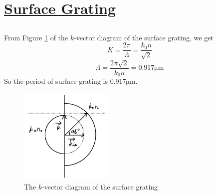 \documentclass[fontsize=11pt]{scrartcl}
\begin{document}
\section{\uline{Surface Grating}}
\subsection{}
From Figure \ref{fig1.1} of the $k$-vector diagram of the surface grating, we get
\begin{equation}
    K=\frac{2 \pi}{\Lambda}=\frac{k_{0} n}{\sqrt{2}}
    \end{equation}
\begin{equation}
    \Lambda=\frac{2 \pi \sqrt{2}}{k_{0} n}=0.917 \mathrm{\mu m}
    \end{equation}   
So the period of surface grating is $0.917\mathrm{\mu m}$.
\begin{figure}[H]
    \centering
     \includegraphics[width=0.4\textwidth]{img/fig1.1.png}
     \caption{The $k$-vector diagram of the surface grating}
     \label{fig1.1}
\end{figure}
\end{document}
